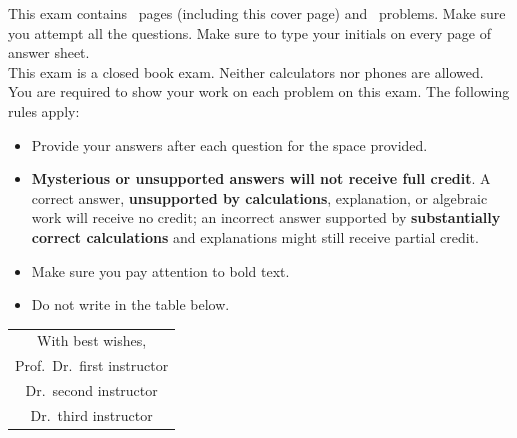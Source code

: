 \documentclass[11pt, addpoints]{exam}
\begin{document}
This exam contains \numpages\ pages (including this cover page) and
\numquestions\ problems.  Make sure you attempt all the questions.  Make sure to type your initials on every page of answer sheet.\\

This exam is a closed book exam. Neither calculators nor phones are allowed. You are required to show your work on each problem on this exam.  The following rules apply:

\begin{itemize}
\item Provide your answers after each question for the space provided.
\item \textbf{Mysterious or unsupported answers will not receive full
credit}.  A correct answer, \textbf{unsupported by calculations}, explanation,
or algebraic work will receive no credit; an incorrect answer supported
by \textbf{substantially correct calculations} and explanations might still receive
partial credit.
\item Make sure you pay attention to bold text.
\item Do not write in the table below.
\end{itemize}

\vspace{0.5cm}

\begin{center}
\gradetable[h]
\end{center}

\vspace{0.5cm}

\begin{flushright}
\begin{tabular}{@{}c@{}}
With best wishes,\\

Prof.\ Dr.\ first instructor\\
Dr.\ second instructor\\
Dr.\ third instructor\\
\end{tabular}
\end{flushright}    


\newpage

\begin{center}
{\Large{\color{red}{Ex: A page without Medipol's header and footer, and a question with parts.}}}\\
\end{center}
\end{document}
